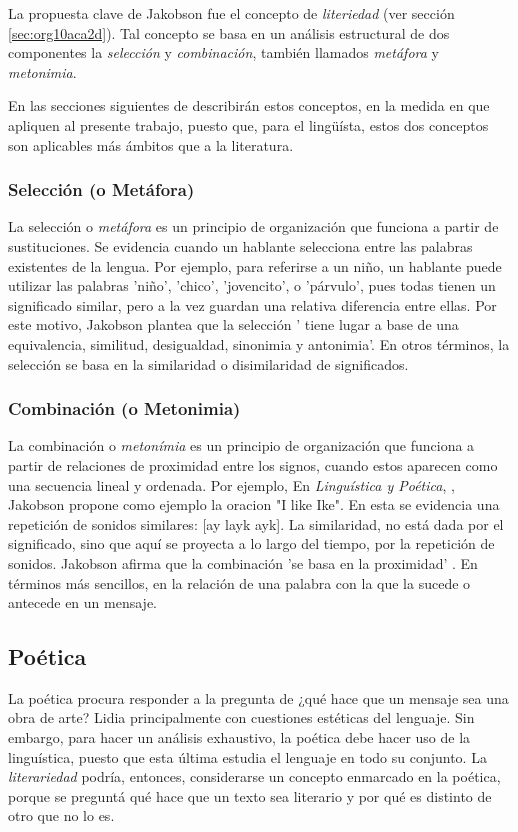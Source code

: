 \documentclass[12pt,letterpaper,twoside]{article}
\begin{document}
La propuesta clave de Jakobson fue el concepto de \emph{literiedad}
(ver sección \ref{sec:org10aca2d}). Tal concepto se basa en un análisis
estructural de dos componentes la \emph{selección} y \emph{combinación},
también llamados \emph{metáfora} y \emph{metonimia}.

En las secciones siguientes de describirán estos conceptos, en la
medida en que apliquen al presente trabajo, puesto que, para el
lingüísta, estos dos conceptos son aplicables más ámbitos que a la
literatura.


\subsubsection{Selección (o Metáfora)}
\label{sec:org19b0ee4}

La selección o \emph{metáfora} es un principio de organización que
funciona a partir de  sustituciones. Se evidencia cuando un hablante
selecciona entre las palabras existentes de la lengua.  Por
ejemplo, para referirse a un niño, un hablante puede utilizar las
palabras 'niño', 'chico', 'jovencito', o 'párvulo', pues todas
tienen un significado similar, pero a la vez guardan una relativa
diferencia entre ellas.  Por este motivo, Jakobson
\cite[pg. 128]{jakobson1981linguistica} plantea que la selección '
tiene lugar a base de una equivalencia, similitud, desigualdad,
sinonimia y antonimia'. En otros términos, la selección se basa en
la similaridad o disimilaridad de significados.


\subsubsection{Combinación (o Metonimia)}
\label{sec:org8fa5b69}

La combinación o \emph{metonímia} es un principio de organización que
funciona a partir de relaciones de proximidad entre los signos,
cuando estos aparecen como una secuencia lineal y ordenada. Por
ejemplo, En \emph{Linguística y Poética},
\cite{jakobson1981linguistica}, Jakobson propone como ejemplo la
oracion "I like Ike". En esta se evidencia una repetición de
sonidos similares: [ay layk ayk]. La similaridad, no está dada por
el significado, sino que aquí se proyecta a lo largo del tiempo,
por la repetición de sonidos. Jakobson afirma que la combinación
'se basa en la proximidad'
\cite[pg. 128]{jakobson1981linguistica}. En términos más sencillos,
en la relación de una palabra con la que la sucede o antecede en un
mensaje.

\subsection{Poética}
\label{sec:org6c3c96f}
La poética procura responder a la pregunta de ¿qué hace que un
mensaje sea una obra de arte? Lidia principalmente con cuestiones
estéticas del lenguaje. Sin embargo, para hacer un análisis
exhaustivo, la poética debe hacer uso de la linguística, puesto
que esta última estudia el lenguaje en todo su conjunto. La
\emph{literariedad} podría, entonces, considerarse un concepto
enmarcado en la poética, porque se preguntá qué hace que un texto
sea literario y por qué es distinto de otro que no lo es.
\end{document}

